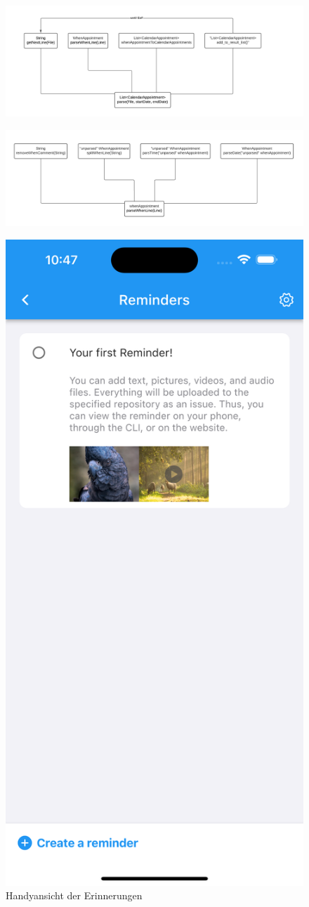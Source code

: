 \begin{figure}
  \centering
  \includegraphics[width=1.2\linewidth]{res/Ablage-basiert1.png}
  \label{fig:ablage_basiert1}
\end{figure}
\begin{figure}
  \centering
  \includegraphics[width=1.2\linewidth]{res/Ablage-basiert2.png}
  \label{fig:ablage_basiert2}
\end{figure}
%




\begin{figure}
    \centering
    \includegraphics[width=.5\textwidth]{res/reminder_handy.png} 
    \caption{Handyansicht der Erinnerungen} 
    \label{pic:reminder_handy}
\end{figure}

